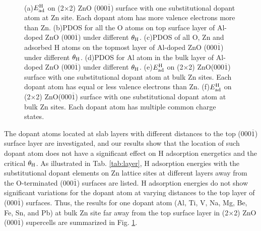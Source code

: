 \begin{figure}[!ht]
  \\
  \label{Chap:ZnO_H:fig:dop5}
  \label{Chap:ZnO_H:fig:dop6}
\caption[H adsorptions on ZnO surfaces with different doping]{(a)$E_{\textup{ad}}^{\textup{H}}$ on (2$\times$2) ZnO (000$\overline{1}$) surface with one substitutional dopant atom at Zn site. Each dopant atom has more valence electrons more than Zn. (b)\ac{PDOS} for all the O atoms on top surface layer of Al-doped ZnO (000$\overline{1}$) under different $\theta_{\textup{H}}$. (c)\ac{PDOS} of all O, Zn and adsorbed H atoms on the topmost layer of Al-doped ZnO (000$\overline{1}$) under different $\theta_{\textup{H}}$. (d)\ac{PDOS} for Al atom in the bulk layer of Al-doped ZnO (000$\overline{1}$) under different $\theta_{\textup{H}}$. (e)$E_{\textup{ad}}^{\textup{H}}$ on (2$\times$2) ZnO(000$\overline{1}$) surface with one substitutional dopant atom at bulk Zn sites. Each dopant atom has equal or less valence electrons than Zn. (f)$E_{\textup{ad}}^{\textup{H}}$ on (2$\times$2) ZnO(000$\overline{1}$) surface with one substitutional dopant atom at bulk Zn sites. Each dopant atom has multiple common charge states.}
\label{Chap:ZnO_H:fig:doped}
\end{figure}
\endgroup

The dopant atoms located at slab layers with different distances to the top (000$\overline{1}$) surface layer are investigated, and our results show that the location of such dopant atom does not have a significant effect on H adsorption energetics and the critical $\theta_{\textup{H}}$. As illustrated in Tab. \ref{tab:layer}, H adsorption energies with the substitutional dopant elements on Zn lattice sites at different layers away from the O-terminated (000$\bar{1}$) surfaces are listed. H adsorption energies do not show significant variations for the dopant atom at varying distances to the top layer of (000$\bar{1}$) surfaces. Thus, the results for one dopant atom (Al, Ti, V, Na, Mg, Be, Fe, Sn, and Pb) at bulk Zn site far away from the top surface layer in (2$\times$2) ZnO (000$\overline{1}$) supercells are summarized in Fig. \ref{Chap:ZnO_H:fig:doped}. 

